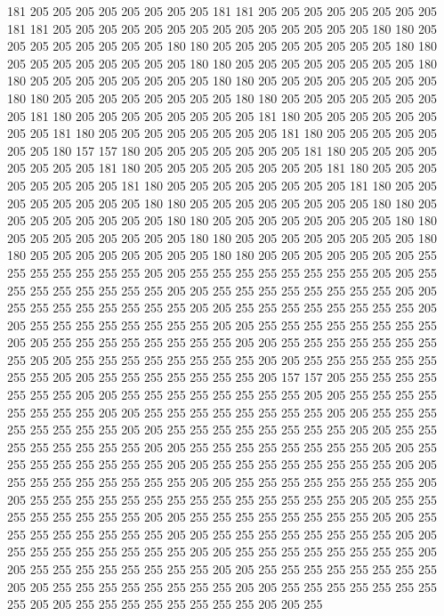 181 205 205 205 205 205 205 205 205 181 181 205 205 205 205 205 205 205 205 181
181 205 205 205 205 205 205 205 205 205 205 205 205 205 205 180 180 205 205 205
205 205 205 205 205 180 180 205 205 205 205 205 205 205 205 180 180 205 205 205
205 205 205 205 205 180 180 205 205 205 205 205 205 205 205 180 180 205 205 205
205 205 205 205 205 180 180 205 205 205 205 205 205 205 205 180 180 205 205 205
205 205 205 205 205 180 180 205 205 205 205 205 205 205 205 181 180 205 205 205
205 205 205 205 205 181 180 205 205 205 205 205 205 205 205 181 180 205 205 205
205 205 205 205 205 181 180 205 205 205 205 205 205 205 180 157 157 180 205 205
205 205 205 205 205 181 180 205 205 205 205 205 205 205 205 181 180 205 205 205
205 205 205 205 205 181 180 205 205 205 205 205 205 205 205 181 180 205 205 205
205 205 205 205 205 181 180 205 205 205 205 205 205 205 205 180 180 205 205 205
205 205 205 205 205 180 180 205 205 205 205 205 205 205 205 180 180 205 205 205
205 205 205 205 205 180 180 205 205 205 205 205 205 205 205 180 180 205 205 205
205 205 205 205 205 180 180 205 205 205 205 205 205 205 205 180 180 205 205 205
205 205 205 205 255 255 255 255 255 255 255 205 205 255 255 255 255 255 255 255
255 205 205 255 255 255 255 255 255 255 255 205 205 255 255 255 255 255 255 255
255 205 205 255 255 255 255 255 255 255 255 205 205 255 255 255 255 255 255 255
255 205 205 255 255 255 255 255 255 255 255 205 205 255 255 255 255 255 255 255
255 205 205 255 255 255 255 255 255 255 255 205 205 255 255 255 255 255 255 255
255 205 205 255 255 255 255 255 255 255 255 205 205 255 255 255 255 255 255 255
255 205 205 255 255 255 255 255 255 255 205 157 157 205 255 255 255 255 255 255
255 205 205 255 255 255 255 255 255 255 255 205 205 255 255 255 255 255 255 255
255 205 205 255 255 255 255 255 255 255 255 205 205 255 255 255 255 255 255 255
255 205 205 255 255 255 255 255 255 255 255 205 205 255 255 255 255 255 255 255
255 205 205 255 255 255 255 255 255 255 255 205 205 255 255 255 255 255 255 255
255 205 205 255 255 255 255 255 255 255 255 205 205 255 255 255 255 255 255 255
255 205 205 255 255 255 255 255 255 255 255 205 205 255 255 255 255 255 255 255
255 255 255 255 255 255 255 205 205 255 255 255 255 255 255 255 255 205 205 255
255 255 255 255 255 255 255 205 205 255 255 255 255 255 255 255 255 205 205 255
255 255 255 255 255 255 255 205 205 255 255 255 255 255 255 255 255 205 205 255
255 255 255 255 255 255 255 205 205 255 255 255 255 255 255 255 255 205 205 255
255 255 255 255 255 255 255 205 205 255 255 255 255 255 255 255 255 205 205 255
255 255 255 255 255 255 255 205 205 255 255 255 255 255 255 255 255 205 205 255
